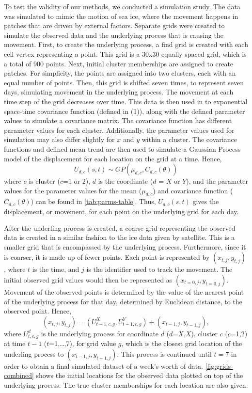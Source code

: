 \documentclass[12pt]{article}
\begin{document}
To test the validity of our methods, we conducted a simulation study.
The data was simulated to mimic the motion of sea ice, where the
movement happens in patches that are driven by external factors.
Separate grids were created to simulate the observed data and the
underlying process that is causing the movement. First, to create the
underlying process, a find grid is created with each cell vertex
representing a point. This grid is a 30x30 equally spaced grid, which is
a total of 900 points. Next, initial cluster memberships are assigned to
create patches. For simplicity, the points are assigned into two
clusters, each with an equal number of points. Then, this grid is
shifted seven times, to represent seven days, simulating movement in the
underlying process. The movement at each time step of the grid decreases
over time. This data is then used in to exponential space-time
covariance function (defined in (1)), along with the defined parameter
values to simulate a covariance matrix. The covariance function has
different parameter values for each cluster. Additionally, the parameter
values used for simulation may also differ slightly for \(x\) and \(y\)
within a cluster. The covariance functions and defined mean trend are
then used to simulate a Gaussian Process model of the displacement for
each location on the grid at a time. Hence,
\[ U_{d,c}(s,t) \sim GP(\mu_{d,c}, C_{d,c}(\theta))\] where \(c\) is
cluster (\(c\)=1 or 2), \(d\) is the coordinate (\(d\) = \(X\) or
\(Y\)), and the parameter values for the parameter values for the mean
(\(\mu_{d,c}\)) and covariance function (\(C_{d,c}(\theta)\)) can be
found in \cref{tab:parms-table}. Thus, \(U_{d,c}(s,t)\) gives the
displacement, or movement, for each point on the underlying grid for
each day.

After the underling process is created, a coarse grid representing the
observed data is created in a similar fashion to the ice data given by
satellite. This is a smaller grid that is encompassed by the underlying
process. Furthermore, since it is coarser, it is made up of fewer
points. Each point is represented by \((x_{t,j}, y_{t,j})\), where \(t\)
is the time, and \(j\) is the identifier used to track the movement. The
initial observed grid values would then be represented as
\((x_{t=0,j}, y_{t=0,j})\). Movement of the observed points is
determined by the value of the nearest point of the underlying process
for that day, determined by Euclidean distance, to the observed point.
Hence,
\[(x_{t,j}, y_{t,j}) = (U^{X}_{t-1,c,g}, U^{Y}_{t-1,c,g}) + (x_{t-1,j}, y_{t-1,j}),\]
where \(U^d_{t,c,g}\) is the underlying process for coordinate \(d\)
(\(d\)=\(X\),\(X\)), cluster \(c\) (\(c\)=1,2) at time \(t-1\)
(\(t\)=1,\ldots,7), for grid value \(g\), which is the closest grid
location of the underling process to \((x_{t-1,j}, y_{t-1,j})\). This
process is continued until \(t=7\) in order to obtain a final simulated
dataset of a week's worth of data. \cref{fig:grids-combined} shows the
initial locations for the observed data plotted on top of the underlying
process. The true cluster memberships for each location are also given.
\end{document}
